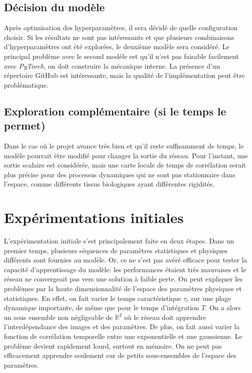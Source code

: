 \documentclass[MSc,french]{ulthese}
\begin{document}
\section{Décision du modèle}
Après optimisation des hyperparamètres, il sera décidé de quelle configuration choisir. Si les résultats ne sont pas intéressants et que plusieurs combinaisons d'hyperparamètres ont été explorées, le deuxième modèle sera considéré. Le principal problème avec le second modèle est qu'il n'est pas faisable facilement avec \textit{PyTorch}, on doit construire la mécanique interne. La présence d'un répertoire GitHub est intéressante, mais la qualité de l'implémentation peut être problématique.
\section{Exploration complémentaire (si le temps le permet)}
Dans le cas où le projet avance très bien et qu'il reste suffisamment de temps, le modèle pourrait être modifié pour changer la sortie du réseau. Pour l'instant, une sortie scalaire est considérée, mais une carte locale de temps de corrélation serait plus précise pour des processus dynamiques qui ne sont pas stationnaire dans l'espace, comme différents tissus biologiques ayant différentes rigidités.
\newpage
\chapter{Expérimentations initiales}
L'expérimentation initiale s'est principalement faite en deux étapes. Dans un premier temps, plusieurs séquences de paramètres statistiques et physiques différents sont fournies au modèle. Or, ce ne s'est pas avéré efficace pour tester la capacité d'apprentissage du modèle: les performances étaient très mauvaises et le réseau ne convergeait pas vers une solution à faible perte. On peut expliquer les problèmes par la haute dimensionnalité de l'espace des paramètres physiques et statistiques. En effet, on fait varier le temps caractéristique $\tau_c$ sur une plage dynamique importante, de même que pour le temps d'intégration $T$. On a alors un sous ensemble non négligeable de $\mathbb{R}^2$ où le réseau doit apprendre l'interdépendance des images et des paramètres. De plus, on fait aussi varier la fonction de corrélation temporelle entre une exponentielle et une gaussienne. Le problème devient rapidement lourd, surtout en mémoire. On ne peut pas efficacement apprendre seulement sur de petits sous-ensembles de l'espace des paramètres.\\ \\
\end{document}
